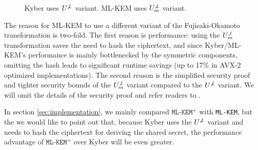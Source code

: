 \documentclass[journal=tches,submission]{iacrtrans}
\begin{document}
\begin{figure}[H]
    \caption{
        Kyber uses $U^{\not\bot}$ variant. ML-KEM uses $U^{\not\bot}_m$ variant.
    }\label{fig:kyber-ml-kem-compare}
\end{figure}

The reason for ML-KEM to use a different variant of the Fujisaki-Okamoto transformation is two-fold. The first reason is performance: using the $U^{\not\bot}_m$ transformation saves the need to hash the ciphertext, and since Kyber/ML-KEM's performance is mainly bottlenecked by the symmetric components, omitting the hash leads to significant runtime savings (up to 17\% in AVX-2 optimized implementations). The second reason is the simplified security proof and tighter security bounds of the $U^{\not\bot}_m$ variant compared to the $U^{\not\bot}$ variant. We will omit the details of the security proof and refer readers to \cite{hofheinz2017modular}.

In section \ref{sec:implementation}, we mainly compared $\texttt{ML-KEM}^+$ with \texttt{ML-KEM}, but the we would like to point out that, because Kyber uses the $U^{\not\bot}$ variant and needs to hash the ciphertext for deriving the shared secret, the performance advantage of $\texttt{ML-KEM}^+$ over Kyber will be even greater.
\end{document}
